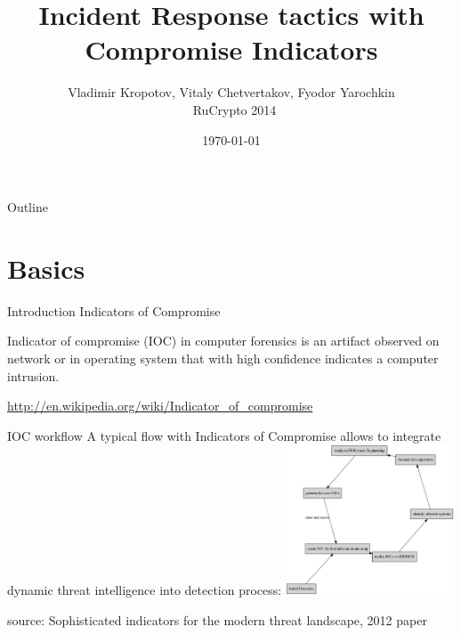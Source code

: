 \documentclass[presentation,smaller]{beamer}
\institute{Affilations:  Academia Sinica, o0o.nu, chroot.org}
\author{Vladimir Kropotov, Vitaly Chetvertakov, Fyodor Yarochkin\\\ RuCrypto 2014}
\date{\today}
\title{Incident Response tactics with Compromise Indicators}
\begin{document}
\maketitle
\begin{frame}{Outline}
\tableofcontents
\end{frame}


\section{Basics}
\label{sec-1}
\begin{frame}[label=sec-1-1]{Introduction}
\alert{Indicators of Compromise}

Indicator of compromise (IOC) in computer forensics is an artifact
observed on network or in operating system that with high confidence
indicates a computer intrusion.

\url{http://en.wikipedia.org/wiki/Indicator_of_compromise}
\end{frame}


\begin{frame}[label=sec-1-2]{IOC workflow}
A typical flow with Indicators of Compromise allows
to integrate dynamic threat intelligence into detection 
process:
\includegraphics[width=5cm]{images/ioc.png}

source: Sophisticated indicators for the modern threat landscape, 2012
paper
\end{frame}
\end{document}

